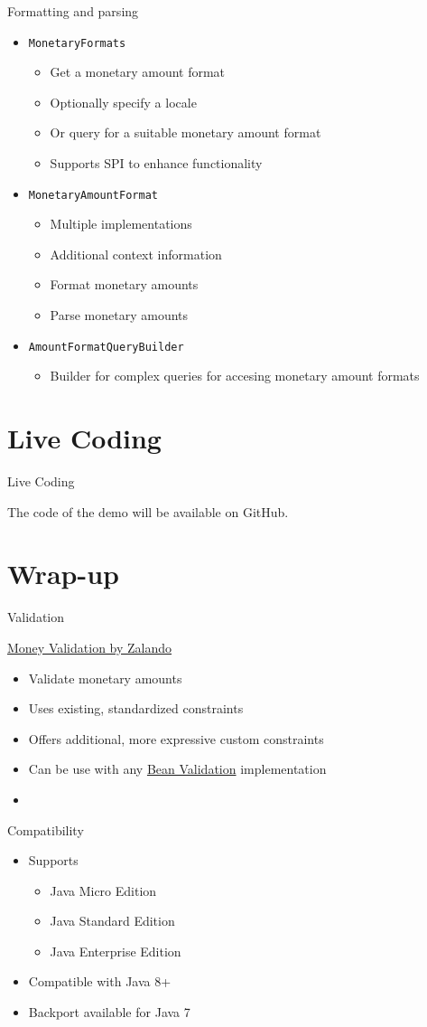 \documentclass{beamer}
\newcommand{\code}[1]{\texttt{#1}}
\newcommand{\listing}[1]{
	\begin{itemize}
		\item[]
	\end{itemize}
}
\newcommand{\slideItems}[1]{
	\begin{itemize}
		#1
	\end{itemize}
}
\newcommand{\slide}[2]{
	\begin{frame}{#1}
		#2
	\end{frame}
}
\begin{document}
\slide{Formatting and parsing}{
	\slideItems{
		\item \code{MonetaryFormats}
			\slideItems{
				\item Get a monetary amount format
				\item Optionally specify a locale
				\item Or query for a suitable monetary amount format
				\item Supports SPI to enhance functionality
			}
		\item \code{MonetaryAmountFormat}
			\slideItems{
				\item Multiple implementations
				\item Additional context information
				\item Format monetary amounts
				\item Parse monetary amounts
			}
		\item \code{AmountFormatQueryBuilder}
			\slideItems{
				\item Builder for complex queries for accesing monetary amount formats
			}
	}
}

\section{Live Coding}

\slide{}{
	\begin{center}
		\huge{Live Coding}
	
		\large{The code of the demo will be available on GitHub.}
	\end{center}
}

\section{Wrap-up}

\slide{Validation}{
	\href{https://github.com/zalando/money-validation}{Money Validation by Zalando}
	\slideItems{
		\item Validate monetary amounts
		\item Uses existing, standardized constraints
		\item Offers additional, more expressive custom constraints
		\item Can be use with any \href{http://beanvalidation.org/}{Bean Validation} implementation
	}
	\listing{validation.java}
}

\slide{Compatibility}{
	\slideItems{
		\item Supports
			\slideItems{
				\item Java Micro Edition
				\item Java Standard Edition
				\item Java Enterprise Edition
			}
		\item Compatible with Java 8+
		\item Backport available for Java 7
	}
}
\end{document}
